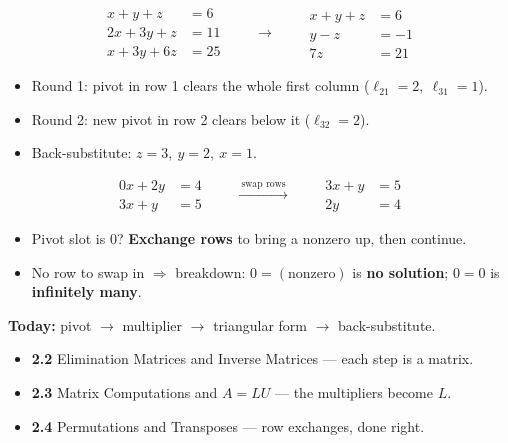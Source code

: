 \documentclass[aspectratio=169, 11pt]{beamer}
\begin{document}
\begin{frame}[t, plain]
  \[
    \begin{aligned}
      x + y + z &= 6 \\
      2x + 3y + z &= 11 \\
      x + 3y + 6z &= 25
    \end{aligned}
    \qquad\longrightarrow\qquad
    \begin{aligned}
      x + y + z &= 6 \\
      y - z &= -1 \\
      7z &= 21
    \end{aligned}
  \]
  \begin{itemize}
    \setlength{\itemsep}{4pt}
    \item Round 1: pivot in row 1 clears the whole first column ($\ell_{21}=2,\ \ell_{31}=1$).
    \item Round 2: new pivot in row 2 clears below it ($\ell_{32}=2$).
    \item Back-substitute: $z=3,\ y=2,\ x=1$.
  \end{itemize}
\end{frame}

\begin{frame}[t, plain]
  \[
    \begin{aligned}
      0x + 2y &= 4 \\
      3x + y &= 5
    \end{aligned}
    \qquad\xrightarrow{\ \text{swap rows}\ }\qquad
    \begin{aligned}
      3x + y &= 5 \\
      2y &= 4
    \end{aligned}
  \]
  \begin{itemize}
    \setlength{\itemsep}{5pt}
    \item Pivot slot is $0$? \textbf{Exchange rows} to bring a nonzero up, then continue.
    \item No row to swap in $\Rightarrow$ breakdown: $0=(\text{nonzero})$ is \textbf{no solution};
          $0=0$ is \textbf{infinitely many}.
  \end{itemize}
\end{frame}

\begin{frame}[t, plain]
  \textbf{Today:} pivot $\to$ multiplier $\to$ triangular form $\to$ back-substitute.\\[8pt]
  \begin{itemize}
    \setlength{\itemsep}{4pt}
    \item \textbf{2.2} Elimination Matrices and Inverse Matrices --- each step is a matrix.
    \item \textbf{2.3} Matrix Computations and $A=LU$ --- the multipliers become $L$.
    \item \textbf{2.4} Permutations and Transposes --- row exchanges, done right.
  \end{itemize}
\end{frame}
\end{document}
